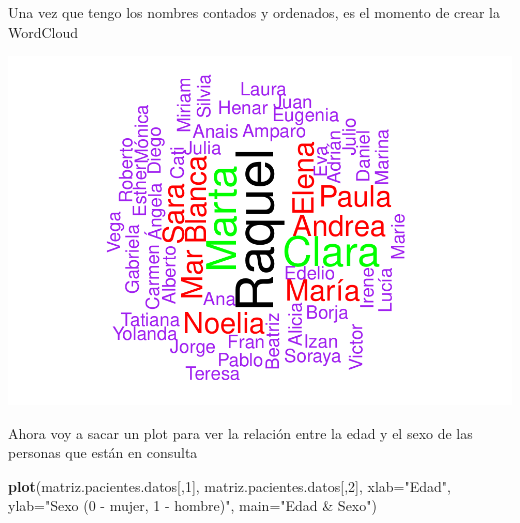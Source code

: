 \documentclass[]{article}
\newenvironment{Shaded}{\begin{snugshade}}{\end{snugshade}}
\newcommand{\KeywordTok}[1]{\textcolor[rgb]{0.13,0.29,0.53}{\textbf{#1}}}
\newcommand{\DataTypeTok}[1]{\textcolor[rgb]{0.13,0.29,0.53}{#1}}
\newcommand{\DecValTok}[1]{\textcolor[rgb]{0.00,0.00,0.81}{#1}}
\newcommand{\FloatTok}[1]{\textcolor[rgb]{0.00,0.00,0.81}{#1}}
\newcommand{\StringTok}[1]{\textcolor[rgb]{0.31,0.60,0.02}{#1}}
\newcommand{\CommentTok}[1]{\textcolor[rgb]{0.56,0.35,0.01}{\textit{#1}}}
\newcommand{\OtherTok}[1]{\textcolor[rgb]{0.56,0.35,0.01}{#1}}
\newcommand{\OperatorTok}[1]{\textcolor[rgb]{0.81,0.36,0.00}{\textbf{#1}}}
\newcommand{\NormalTok}[1]{#1}
\begin{document}
Una vez que tengo los nombres contados y ordenados, es el momento de
crear la WordCloud

\begin{Shaded}
\end{Shaded}

\includegraphics{codigo_files/figure-latex/wordcloud-1.pdf}

Ahora voy a sacar un plot para ver la relación entre la edad y el sexo
de las personas que están en consulta

\begin{Shaded}
\begin{Highlighting}[]
\KeywordTok{plot}\NormalTok{(matriz.pacientes.datos[,}\DecValTok{1}\NormalTok{], matriz.pacientes.datos[,}\DecValTok{2}\NormalTok{], }\DataTypeTok{xlab=}\StringTok{"Edad"}\NormalTok{, }\DataTypeTok{ylab=}\StringTok{"Sexo (0 - mujer, 1 - hombre)"}\NormalTok{, }\DataTypeTok{main=}\StringTok{"Edad & Sexo"}\NormalTok{)}
\end{Highlighting}
\end{Shaded}
\end{document}
